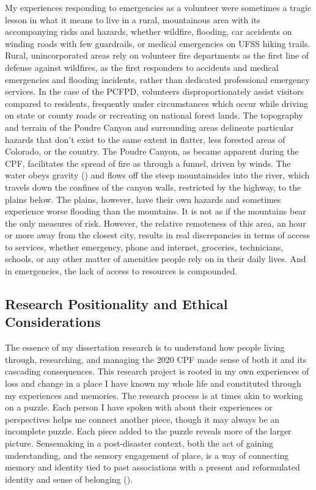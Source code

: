\documentclass[
]{article}
\begin{document}
My experiences responding to emergencies as a volunteer were sometimes a tragic lesson in what it means to live in a rural, mountainous area with its accompanying risks and hazards, whether wildfire, flooding, car accidents on winding roads with few guardrails, or medical emergencies on UFSS hiking trails. Rural, unincorporated areas rely on volunteer fire departments as the first line of defense against wildfires, as the first responders to accidents and medical emergencies and flooding incidents, rather than dedicated professional emergency services. In the case of the PCFPD, volunteers disproportionately assist visitors compared to residents, frequently under circumstances which occur while driving on state or county roads or recreating on national forest lands. The topography and terrain of the Poudre Canyon and surrounding areas delineate particular hazards that don't exist to the same extent in flatter, less forested areas of Colorado, or the country. The Poudre Canyon, as became apparent during the CPF, facilitates the spread of fire as through a funnel, driven by winds. The water obeys gravity () and flows off the steep mountainsides into the river, which travels down the confines of the canyon walls, restricted by the highway, to the plains below. The plains, however, have their own hazards and sometimes experience worse flooding than the mountains. It is not as if the mountains bear the only measures of risk. However, the relative remoteness of this area, an hour or more away from the closest city, results in real discrepancies in terms of access to services, whether emergency, phone and internet, groceries, technicians, schools, or any other matter of amenities people rely on in their daily lives. And in emergencies, the lack of access to resources is compounded.

\subsection{Research Positionality and Ethical Considerations}\label{research-positionality-and-ethical-considerations}

The essence of my dissertation research is to understand how people living through, researching, and managing the 2020 CPF made sense of both it and its cascading consequences. This research project is rooted in my own experiences of loss and change in a place I have known my whole life and constituted through my experiences and memories. The research process is at times akin to working on a puzzle. Each person I have spoken with about their experiences or perspectives helps me connect another piece, though it may always be an incomplete puzzle. Each piece added to the puzzle reveals more of the larger picture. Sensemaking in a post-disaster context, both the act of gaining understanding, and the sensory engagement of place, is a way of connecting memory and identity tied to past associations with a present and reformulated identity and sense of belonging ().
\end{document}
